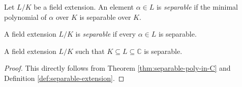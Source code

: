 \begin{definition}
    Let $L/K$ be a field extension. An element $\alpha \in L$ is \textit{separable} if the minimal polynomial of $\alpha$ over $K$ is separable over $K$.
\end{definition}

\begin{definition} \label{def:separable-extension}
    A field extension $L / K$ is \textit{separable} if every $\alpha \in L$ is separable.
\end{definition}

\begin{theorem}
    A field extension $L/K$ such that $K \subseteq L \subseteq \mathbb C$ is separable. 
\end{theorem}

\begin{proof}
    This directly follows from Theorem \ref{thm:separable-poly-in-C} and Definition \ref{def:separable-extension}. 
\end{proof}
